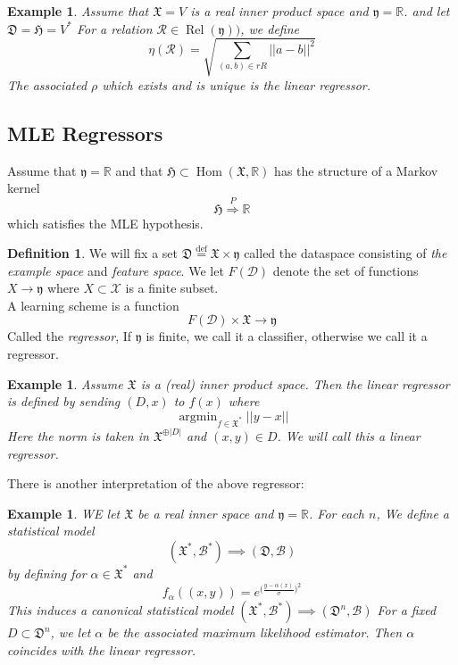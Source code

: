 \documentclass{book}
\theoremstyle{plain}
\newtheorem{example}[corollary]{Example}
\theoremstyle{definition}
\newtheorem{definition}[corollary]{Definition}
\DeclareMathOperator{\argmin}{argmin}
\renewcommand{\d}[1]{\mathbb{#1}}
\newcommand{\define}{\stackrel{\operatorname{def}}{=}}
\newcommand{\ds}{\oplus}
\newcommand{\f}[1]{\mathfrak{#1}}
\DeclareMathOperator{\Hom}{Hom}
\newcommand{\mor}{\longrightarrow}
\DeclareMathOperator{\Rel}{Rel}
\renewcommand{\r}[1]{\mathcal{#1}}
\begin{document}
\begin{example}
Assume that $\f{X}=V$ is a real inner product space and $\f{y}=\d{R}$. and let $\f{D}=\f{H}=V^*$
For a relation $\r{R} \in \Rel(\f{y}))$, we define
\[
\eta(\r{R})=\sqrt{\sum_{(a,b) \in r{R}}\vert\vert a-b\vert \vert ^2}
\]
The associated $\rho$ which exists and is unique is the linear regressor.
\end{example}

\subsection{MLE Regressors}

Assume that $\f{y}=\d{R}$ and that $\f{H}\subset \Hom(\f{X},\d{R})$ has the structure of a Markov kernel
\[
\f{H}\stackrel{P}{\Longrightarrow} \d{R}
\]
which satisfies the MLE hypothesis.
\begin{definition}
We will fix a set $\f{D}\define \f{X}\times \f{y}$ called the dataspace consisting of \emph{the example space} and \emph{feature space}. We let $F(\r{D})$ denote the set of functions $X \mor \f{y}$ where $X\subset \r{X}$ is a finite subset.\\
A learning scheme is a function
\[
F(\r{D})\times \f{X}\mor \f{y}
\]
Called the \emph{regressor}, 
If $\f{y}$ is finite, we call it a classifier, otherwise we call it a regressor.
\end{definition}


\begin{example}
Assume $\f{X}$ is a (real) inner product space. Then the linear regressor is defined by sending $(D,x)$ to $f(x)$ where
\[
\argmin_{f\in \f{X}^*} \vert \vert y-x \vert \vert 
\]	
Here the norm is taken in $\f{X}^{\ds \vert D\vert }$ and $(x,y)\in D$. We will call this a linear regressor.
\end{example}

There is another interpretation of the above regressor:

\begin{example}
WE let $\f{X}$ be a real inner space and $\f{y}=\d{R}$. For each $n$, We define a statistical model
\[
(\f{X}^*,\r{B}^*)\implies (\f{D},\r{B})
\]
by defining for $\alpha \in \f{X}^*$ and
\[
f_{\alpha}((x,y))= e^{\bigg(\frac{y-\alpha(x)}{\sigma}\bigg)^2}
\] 
This induces a canonical statistical model  $(\f{X}^*,\r{B}^*)\implies (\f{D}^n,\r{B})$ 
For a fixed $D \subset \f{D}^n$, we let $\alpha$ be the associated maximum likelihood estimator. Then $\alpha$ coincides with the linear regressor.
\end{example}
\end{document}
